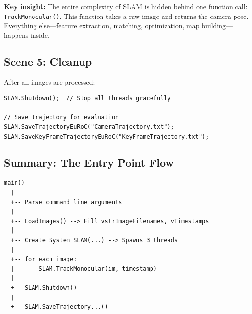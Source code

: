 \textbf{Key insight:} The entire complexity of SLAM is hidden behind one function call: \texttt{TrackMonocular()}. This function takes a raw image and returns the camera pose. Everything else---feature extraction, matching, optimization, map building---happens inside.

\subsection{Scene 5: Cleanup}

After all images are processed:
\begin{lstlisting}[caption={Shutting down}]
SLAM.Shutdown();  // Stop all threads gracefully

// Save trajectory for evaluation
SLAM.SaveTrajectoryEuRoC("CameraTrajectory.txt");
SLAM.SaveKeyFrameTrajectoryEuRoC("KeyFrameTrajectory.txt");
\end{lstlisting}

\subsection{Summary: The Entry Point Flow}

\begin{verbatim}
main()
  |
  +-- Parse command line arguments
  |
  +-- LoadImages() --> Fill vstrImageFilenames, vTimestamps
  |
  +-- Create System SLAM(...) --> Spawns 3 threads
  |
  +-- for each image:
  |       SLAM.TrackMonocular(im, timestamp)
  |
  +-- SLAM.Shutdown()
  |
  +-- SLAM.SaveTrajectory...()
\end{verbatim}

